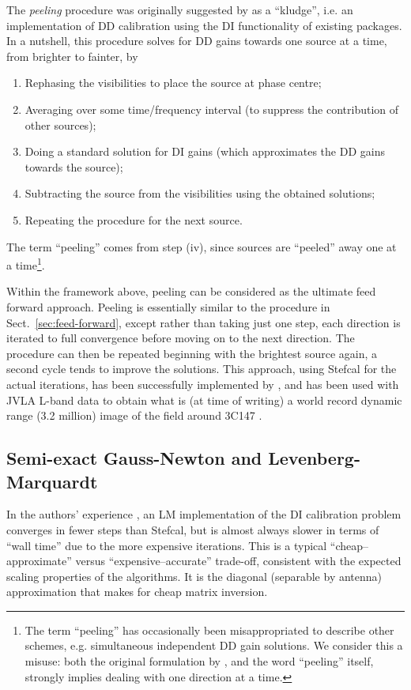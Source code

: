 \documentclass[useAMS,usenatbib]{mn2e}
\begin{document}
The \emph{peeling} procedure was originally suggested by \citet{JEN:peeling} as a ``kludge'', i.e. an implementation of DD calibration 
using the DI functionality of existing packages. In a nutshell, this procedure solves for DD gains towards one source at a time, from
brighter to fainter, by

\begin{enumerate}
\item Rephasing the visibilities to place the source at phase centre;
\item Averaging over some time/frequency interval (to suppress the contribution of other sources);
\item Doing a standard solution for DI gains (which approximates the DD gains towards the source);
\item Subtracting the source from the visibilities using the obtained solutions;
\item Repeating the procedure for the next source.
\end{enumerate}

The term ``peeling'' comes from step (iv), since sources are ``peeled'' away one at a time\footnote{The term ``peeling'' has 
occasionally been misappropriated to describe other schemes, e.g. simultaneous independent DD gain solutions. We consider this a 
misuse: both the original formulation by \citet{JEN:peeling}, and the word ``peeling'' itself, strongly implies dealing with 
one direction at a time.}.

Within the framework above, peeling can be considered as the ultimate feed forward approach. Peeling is essentially similar to 
the procedure in Sect.~\ref{sec:feed-forward}, except rather than taking just one step, each direction is iterated to full 
convergence before moving on to the next direction. The procedure can then be repeated beginning with the brightest source again,
a second cycle tends to improve the solutions. This approach, using Stefcal for the actual iterations, has been successfully
implemented by \citet{OMS-Stefcal}, and has been used with JVLA L-band data to obtain what is (at time of writing) a world 
record dynamic range (3.2 million) image of the field around 3C147 \citep{Perley-3C147}.

\subsection{Semi-exact Gauss-Newton and Levenberg-Marquardt}

In the authors' experience \citep{OMS-Stefcal}, an LM implementation of the DI calibration problem converges in fewer steps 
than Stefcal, but is almost always slower in terms of ``wall time'' due to the more expensive iterations. This is a 
typical ``cheap--approximate'' versus ``expensive--accurate'' trade-off, consistent with the expected scaling properties 
of the algorithms. It is the diagonal (separable by antenna) approximation that makes for cheap matrix inversion.
\end{document}
